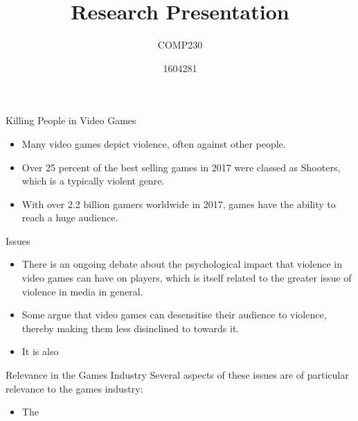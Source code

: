 \documentclass{beamer}
\title{Research Presentation}
\subtitle{COMP230}
\author{1604281}
\begin{document}
\begin{frame}
	\maketitle
\end{frame}

\begin{frame}{Killing People in Video Games}
    \begin{itemize}
        \item Many video games depict violence, often against other people. 
        
        \item Over 25 percent of the best selling games in 2017 were classed as Shooters, which is a typically violent genre. \cite{numberOfGamers}
        
        \item With over 2.2 billion gamers worldwide in 2017, games have the ability to reach a huge audience. \cite{esaReport}
        
    \end{itemize}
\end{frame}

\begin{frame}{Issues}
    \begin{itemize}
        \item There is an ongoing debate about the psychological impact that violence in video games can have on players, which is itself related to the greater issue of violence in media in general. \cite{ExposureLink}
        
        \item Some argue that video games can desensitise their audience to violence, thereby making them less disinclined to towards it. \cite{devalueViolence}
        
        \item It is also 
        
        
    \end{itemize}

\end{frame}

\begin{frame}{Relevance in the Games Industry}
    Several aspects of these issues are of particular relevance to the games industry: 
    
    \begin{itemize}
        \item The 
    \end{itemize}
\end{frame}
\end{document}
